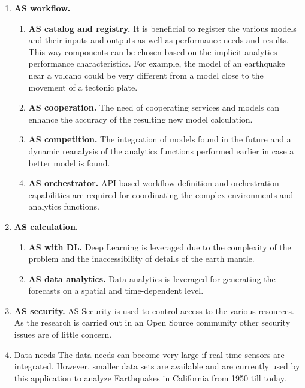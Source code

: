 \begin{enumerate}
\begin{enumerate}
\end{enumerate}

\item{\bf AS workflow.}

  \begin{enumerate}
  
  \item{\bf AS catalog and registry.} It is beneficial to register the 
  various models and their inputs and outputs as well as performance needs and results. This way components can be chosen based on the implicit analytics performance characteristics. For example, the model of an earthquake near a volcano could be very different from a model close to the movement of a tectonic plate.

  \item{\bf AS cooperation.} The need of cooperating services and models can enhance the accuracy of the resulting new model calculation. 
  
  \item{\bf AS competition.} The integration of models found in the future and a dynamic reanalysis of the analytics functions performed earlier in case a better model is found.
 
  \item{\bf AS orchestrator.} API-based workflow definition and orchestration capabilities are required for coordinating the complex environments and analytics functions.
  
  \end{enumerate}


\item{\bf AS calculation.}

  \begin{enumerate}
  
  \item{\bf AS with DL.} Deep Learning is leveraged due to the complexity of the problem and the inaccessibility of details of the earth mantle.
  
  \item{\bf AS data analytics.} Data analytics is leveraged for generating the forecasts on a spatial and time-dependent level.
  
  \end{enumerate}

\item{\bf AS security.} AS Security is used to control access to the various resources. As the research is carried out in an Open Source community other security issues are of little concern. 

\item{Data needs}  The data needs can become very large if real-time sensors are integrated. However, smaller data sets are available and are currently used by this application to analyze Earthquakes in California from 1950 till today.
  

\end{enumerate}



